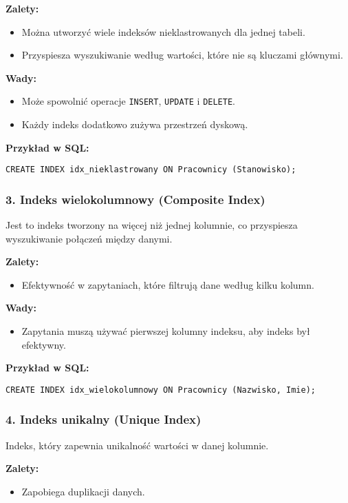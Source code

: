 \textbf{Zalety:}
\begin{itemize}
    \item Można utworzyć wiele indeksów nieklastrowanych dla jednej tabeli.
    \item Przyspiesza wyszukiwanie według wartości, które nie są kluczami głównymi.
\end{itemize}

\textbf{Wady:}
\begin{itemize}
    \item Może spowolnić operacje \texttt{INSERT}, \texttt{UPDATE} i \texttt{DELETE}.
    \item Każdy indeks dodatkowo zużywa przestrzeń dyskową.
\end{itemize}

\textbf{Przykład w SQL:}
\begin{verbatim}
CREATE INDEX idx_nieklastrowany ON Pracownicy (Stanowisko);
\end{verbatim}

\subsubsection{3. Indeks wielokolumnowy (Composite Index)}
Jest to indeks tworzony na więcej niż jednej kolumnie, co przyspiesza wyszukiwanie połączeń między danymi.

\textbf{Zalety:}
\begin{itemize}
    \item Efektywność w zapytaniach, które filtrują dane według kilku kolumn.
\end{itemize}

\textbf{Wady:}
\begin{itemize}
    \item Zapytania muszą używać pierwszej kolumny indeksu, aby indeks był efektywny.
\end{itemize}

\textbf{Przykład w SQL:}
\begin{verbatim}
CREATE INDEX idx_wielokolumnowy ON Pracownicy (Nazwisko, Imie);
\end{verbatim}

\subsubsection{4. Indeks unikalny (Unique Index)}
Indeks, który zapewnia unikalność wartości w danej kolumnie.

\textbf{Zalety:}
\begin{itemize}
    \item Zapobiega duplikacji danych.
\end{itemize}

